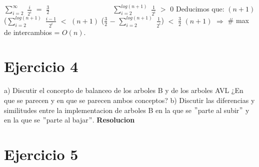 \documentclass[10pt,a4paper]{article}
\begin{document}
\newline
\newline
$\displaystyle \sum_{i=2}^{\infty}$ $\displaystyle \frac{i}{2^{i}}$ $=$ $\displaystyle \frac{3}{2}$~~~~~~~~~~~~~~~~~~$\displaystyle \sum_{i=2}^{log(n+1)}$ $\displaystyle \frac{1}{2^{i}}$ $>$ $0$
\newline
\newline
\newline
Deducimos que:
\newline
\newline
$(n+1)$ ($\displaystyle \sum_{i=2}^{log(n+1)}$ $\displaystyle \frac{i-1}{2^{i}}$ $<$ $(n+1)$ ($\displaystyle \frac{3}{2}$ $-$ $\displaystyle \sum_{i=2}^{log(n+1)}$ $\displaystyle \frac{1}{2^{i}}$) $<$ $\displaystyle \frac{3}{2}$ $(n+1)$ $\Rightarrow$ \# max de intercambios = $O(n)$.
\newpage

\section{Ejercicio 4}

a) Discutir el concepto de balanceo de los arboles B y de los arboles AVL ¿En que se parecen y en que se parecen ambos conceptos?
\newline
\newline
b) Discutir las diferencias y similitudes entre la implementacion de arboles B en la que se $"$parte al subir$"$ y en la que se $"$parte al bajar$"$.
\newline
\newline
\textbf{Resolucion}
\newpage

\section{Ejercicio 5}
\end{document}
